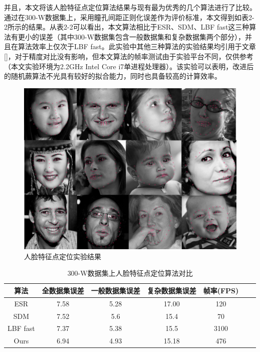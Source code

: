 并且，本文将该人脸特征点定位算法结果与现有最为优秀的几个算法进行了比较。通过在300-W数据集\cite{sagonas2013semi}上，采用瞳孔间距正则化误差作为评价标准\cite{belhumeur2013localizing}\cite{cao2014face}，本文得到如表2-2所示的结果。从表2-2可以看出，本文算法相比于ESR\cite{cao2014face}、SDM\cite{xiong2013supervised}、LBF fast\cite{ren2014face}这三种算法有更小的误差（其中300-W数据集包含一般数据集和复杂数据集两个部分），并且在算法效率上仅次于LBF fast。此实验中其他三种算法的实验结果均引用于文章[]，对于精度对比没有影响，但本文算法的帧率测试由于实验平台不同，仅供参考（本文实验环境为2.2GHz Intel Core i7单进程处理器）。该实验可以表明，改进后的随机蕨算法不光具有较好的拟合能力，同时也具备较高的计算效率。

\begin{figure}[htb]
	\centering 
	\includegraphics[width=\textwidth]{./mypic/人脸特征点定位实验.jpg} 
	\caption{人脸特征点定位实验结果} 
\end{figure}

\begin{table}[htb]
	\caption{300-W数据集上人脸特征点定位算法对比} 
	\centering 
	\begin{tabular}[t]{
		ccccccc} 
		\toprule
		算法 & 全数据集误差 & 一般数据集误差 & 复杂数据集误差 & 帧率(FPS)\\ 
		\midrule
		ESR\cite{cao2014face} & 7.58 & 5.28 & 17.00 & 120 \\
		SDM\cite{xiong2013supervised} & 7.52 & 5.6 & 15.4 & 70 \\
		LBF fast\cite{ren2014face} & 7.37 & 5.38 & 15.5 & 3100 \\
		Ours & 6.94 & 4.93 & 15.18 & 476 \\
		\bottomrule
	\end{tabular}
\end{table}


